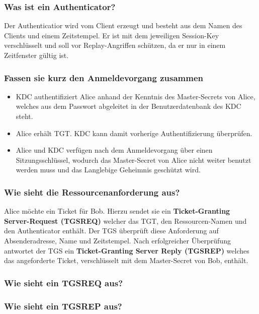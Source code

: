 	\subsubsection{Was ist ein Authenticator?}
	Der Authenticatior wird vom Client erzeugt und besteht aus dem Namen des Clients und einem Zeitstempel. Er ist mit dem jeweiligen Session-Key verschlüsselt und soll vor Replay-Angriffen schützen, da er nur in einem Zeitfenster gültig ist.
	

	
	\subsubsection{Fassen sie kurz den Anmeldevorgang zusammen}
	\begin{itemize}
		\item KDC authentifiziert Alice anhand der Kenntnis des Master-Secrets von Alice, welches aus dem Passwort abgeleitet in der Benutzerdatenbank des KDC steht.
		\item  Alice erhält TGT. KDC kann damit vorherige Authentifizierung überprüfen.
		\item Alice und KDC verfügen nach dem Anmeldevorgang über einen Sitzungsschlüssel, wodurch das Master-Secret von Alice nicht weiter benutzt werden muss und das Langlebige Geheimnis geschützt wird.
	\end{itemize}
	
	\subsubsection{Wie sieht die Ressourcenanforderung aus?}
	Alice möchte ein Ticket für Bob. Hierzu sendet sie ein \textbf{Ticket-Granting Server-Request (TGS\textunderscore REQ)} welcher das TGT, den Ressourcen-Namen und den Authenticator enthält. Der TGS überprüft diese Anforderung auf Absenderadresse, Name und Zeitstempel. Nach erfolgreicher Überprüfung antwortet der TGS  ein \textbf{Ticket-Granting Server Reply (TGS\textunderscore REP)} welches das angeforderte Ticket, verschlüsselt mit dem Master-Secret von Bob, enthält.
	
	\subsubsection{Wie sieht ein TGS\textunderscore REQ aus?}

	
	\subsubsection{Wie sieht ein TGS\textunderscore REP aus?}


